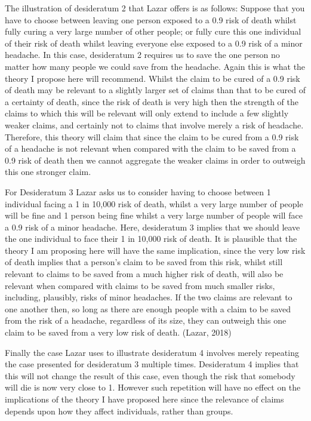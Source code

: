 \documentclass[man,11pt,a4paper]{apa7}
\begin{document}
The illustration of desideratum 2 that Lazar offers is as follows: Suppose that you have to choose between leaving one person exposed to a 0.9 risk of death whilst fully curing a very large number of other people; or fully cure this one individual of their risk of death whilst leaving everyone else exposed to a 0.9 risk of a minor headache. In this case, desideratum 2 requires us to save the one person no matter how many people we could save from the headache. Again this is what the theory I propose here will recommend. Whilst the claim to be cured of a 0.9 risk of death may be relevant to a slightly larger set of claims than that to be cured of a certainty of death, since the risk of death is very high then the strength of the claims to which this will be relevant will only extend to include a few slightly weaker claims, and certainly not to claims that involve merely a risk of headache. Therefore, this theory will claim that since the claim to be cured from a 0.9 risk of a headache is not relevant when compared with the claim to be saved from a 0.9 risk of death then we cannot aggregate the weaker claims in order to outweigh this one stronger claim.

For Desideratum 3 Lazar asks us to consider having to choose between 1 individual facing a 1 in 10,000 risk of death, whilst a very large number of people will be fine and 1 person being fine whilst a very large number of people will face a 0.9 risk of a minor headache. Here, desideratum 3 implies that we should leave the one individual to face their 1 in 10,000 risk of death. It is plausible that the theory I am proposing here will have the same implication, since the very low risk of death implies that a person's claim to be saved from this risk, whilst still relevant to claims to be saved from a much higher risk of death, will also be relevant when compared with claims to be saved from much smaller risks, including, plausibly, risks of minor headaches. If the two claims are relevant to one another then, so long as there are enough people with a claim to be saved from the risk of a headache, regardless of its size, they can outweigh this one claim to be saved from a very low risk of death. (Lazar, 2018)

Finally the case Lazar uses to illustrate desideratum 4 involves merely repeating the case presented for desideratum 3 multiple times. Desideratum 4 implies that this will not change the result of this case, even though the risk that somebody will die is now very close to 1. However such repetition will have no effect on the implications of the theory I have proposed here since the relevance of claims depends upon how they affect individuals, rather than groups.
\end{document}
